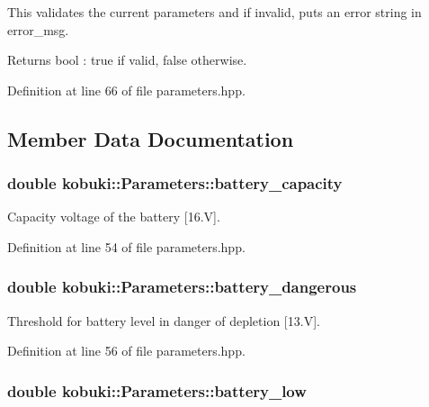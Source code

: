 \-This validates the current parameters and if invalid, puts an error string in error\-\_\-msg.

\begin{DoxyReturn}{\-Returns}
bool \-: true if valid, false otherwise. 
\end{DoxyReturn}


\-Definition at line 66 of file parameters.\-hpp.



\subsection{\-Member \-Data \-Documentation}
\subsubsection[{battery\-\_\-capacity}]{\setlength{\rightskip}{0pt plus 5cm}double {\bf kobuki\-::\-Parameters\-::battery\-\_\-capacity}}\label{classkobuki_1_1Parameters_a0c7b04175141d702f520c4a963876143}


\-Capacity voltage of the battery [16.\-V]. 



\-Definition at line 54 of file parameters.\-hpp.

\subsubsection[{battery\-\_\-dangerous}]{\setlength{\rightskip}{0pt plus 5cm}double {\bf kobuki\-::\-Parameters\-::battery\-\_\-dangerous}}\label{classkobuki_1_1Parameters_a6332cc2748b6f7095e1eb463a024289d}


\-Threshold for battery level in danger of depletion [13.\-V]. 



\-Definition at line 56 of file parameters.\-hpp.

\subsubsection[{battery\-\_\-low}]{\setlength{\rightskip}{0pt plus 5cm}double {\bf kobuki\-::\-Parameters\-::battery\-\_\-low}}\label{classkobuki_1_1Parameters_afbe3833926add7263db592c6b0116b36}


